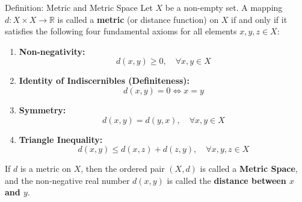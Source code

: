 \documentclass[11pt,a4paper]{article}
\begin{document}
\begin{defbox}{Definition: Metric and Metric Space}
Let $X$ be a non-empty set. A mapping $d: X \times X \to \mathbb{R}$ is called a \textbf{metric} (or distance function) on $X$ if and only if it satisfies the following four fundamental axioms for all elements $x, y, z \in X$:
\begin{enumerate}
    \item[\textbf{[M1]}] \textbf{Non-negativity:}
    \begin{equation}
        d(x, y) \ge 0, \quad \forall x, y \in X
    \end{equation}
    
    \item[\textbf{[M2]}] \textbf{Identity of Indiscernibles (Definiteness):}
    \begin{equation}
        d(x, y) = 0 \iff x = y
    \end{equation}
    
    \item[\textbf{[M3]}] \textbf{Symmetry:}
    \begin{equation}
        d(x, y) = d(y, x), \quad \forall x, y \in X
    \end{equation}
    
    \item[\textbf{[M4]}] \textbf{Triangle Inequality:}
    \begin{equation}
        d(x, y) \le d(x, z) + d(z, y), \quad \forall x, y, z \in X
    \end{equation}
\end{enumerate}
If $d$ is a metric on $X$, then the ordered pair $(X, d)$ is called a \textbf{Metric Space}, and the non-negative real number $d(x, y)$ is called the \textbf{distance between $x$ and $y$}.
\end{defbox}

\begin{center}
\end{center}
\end{document}
